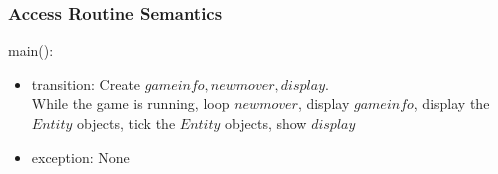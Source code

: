 \documentclass[12pt]{article}
\newcommand{\m}[1]{\mbox{#1}}
\begin{document}
\subsubsection*{Access Routine Semantics}

main():
\begin{itemize}
    \item transition: Create $gameinfo, newmover, display$.\\
                        While the game is running, loop $newmover$, display $gameinfo$, display the $Entity$ objects, tick the $Entity$ objects, show $display$
    \item exception: None
\end{itemize}
\end{document}
